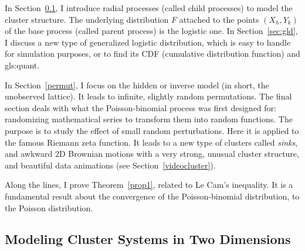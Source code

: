 \documentclass[10pt]{article}
\begin{document}
In  Section~\ref{s:clp}, I introduce \textcolor{index}{radial processes} (called
\textcolor{index}{child processes}) to model the cluster structure. The underlying distribution $F$
attached to the points $(X_h,Y_k)$ of the base process (called \textcolor{index}{parent process})
is the logistic one. In Section~\ref{sec:gld}, I discuss a new type of
\textcolor{index}{generalized logistic distribution}, which is easy to handle for simulation purposes, or to find
its CDF (cumulative distribution function) and \gls{gls:quant}.

In Section~\ref{permut}, I focus on the hidden or \textcolor{index}{inverse model} (in short, the unobserved lattice). It leads to infinite,
slightly \textcolor{index}{random permutations}. The final section deals with what the Poisson-binomial process
was first designed for: randomizing mathematical series to transform them into
\textcolor{index}{random functions}. The purpose is to study the effect of small random perturbations. Here it is applied to the famous \textcolor{index}{Riemann zeta function}. It leads to a new type of clusters called {\em sinks}, and awkward 2D Brownian motions with a very strong, unusual cluster structure, and beautiful data animations (see Section~\ref{videocluster}).

Along the lines, I prove Theorem~\ref{prop1}, related to
\textcolor{index}{Le Cam's inequality}. It is a fundamental result about the convergence of the
\textcolor{index}{Poisson-binomial distribution}, to the Poisson distribution.



\subsection{Modeling Cluster Systems in Two Dimensions}\label{s:clp}
\end{document}
